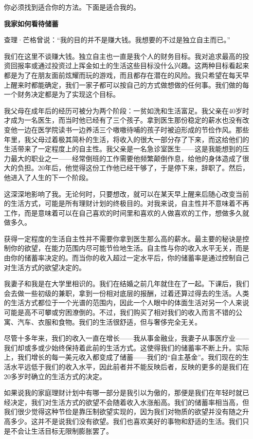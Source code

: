 你必须找到适合你的方法。下面是适合我的。

\textbf{我家如何看待储蓄}

查理·芒格曾说：“我的目的并不是赚大钱。我想要的不过是独立自主而已。”

我们在这里不谈赚大钱。独立自主也一直是我个人的财务目标。我对追求最高的投资回报率或通过投资过上挥金如土的生活这些目标没什么兴趣。这两种目标看起来都是为了在朋友面前炫耀而玩的游戏，而且都存在潜在的风险。我只希望在每天早上醒来时都能确定，我们一家子都可以按自己的方式做想做的任何事。我们做的每一个财务决定都是为了实现这个目标。

我父母在成年后的经历可被分为两个阶段：一贫如洗和生活富足。我父亲在40岁时才成为一名医生，而当时他已经有了三个孩子。拿到医生那份稳定的薪水也没有改变他一边在医学院读书一边养活三个嗷嗷待哺的孩子时被迫形成的节俭作风。那些年里，我父母过着极其简朴的生活，将收入的很大一部分存了下来，而这给他们的生活带来了一定程度上的自主性。我父亲是一名急诊室医生——这是我能想到的压力最大的职业之一——经常倒班的工作需要他频繁颠倒作息，给他的身体造成了很大的负担。20年后，他觉得这份工作他已经干够了，于是停下来，辞职了。然后，他进入了人生的下一个阶段。

这深深地影响了我。无论何时，只要想改，就可以在某天早上醒来后随心改变当前的生活方式，可能是所有理财计划的终极目的。对我来说，自主性并不意味着不再工作，而是意味着可以在自己喜欢的时间里和喜欢的人做喜欢的工作，想做多久就做多久。

获得一定程度的生活自主性并不需要你拿到医生那么高的薪水。最主要的秘诀是控制你的欲望，在能力范围内尽可能节俭地生活。自主性与你的收入水平无关，而是由你的储蓄率决定的。而当你的收入超过一定水平后，你的储蓄率是通过控制自己对生活方式的欲望决定的。

我妻子和我是在大学里相识的。我们在结婚之前几年就住在了一起。下课后，我们会去做一些初级的兼职，拿到一份相对底层的报酬，过着还算过得去的生活。人类的生活方式都位于一个光谱的范围内，因此一个人眼中的体面生活对另一个人来说可能是高不可攀或穷困潦倒的。不过，我们购买了相对我们的收入而言不错的公寓、汽车、衣服和食物。我们的生活很舒适，但与奢侈完全无关。

尽管十多年来，我们的收入一直在增长——我从事金融业，我妻子从事医疗业——我们却或多或少始终保持着此前的生活方式。这使得我们的储蓄率不断上升。实际上，我们增长的每一美元收入都变成了储蓄——我们的“自主基金”。我们现在的生活水平远低于我们的收入水平，因此前者并不能反映后者，反映的更多的是我们在20多岁时确立的生活方式的决定。

如果说我的家庭理财计划中有哪一部分是我引以为傲的，那便是我们在年轻时就已经决定，我们对生活方式的欲望不会随着收入水涨船高。我们的储蓄率相当高，但我们很少觉得这种节俭是靠压制欲望实现的，因为我们对物质的欲望并没有随之升高多少。这并不是说我们没有欲望。我们也喜欢美好的事物和舒适的生活。我们只是不会让生活目标无限制膨胀罢了。

